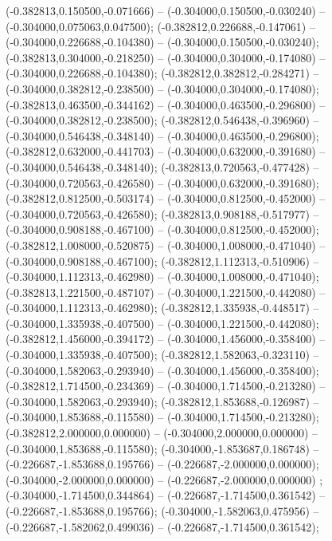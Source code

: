  (-0.382813,0.150500,-0.071666) -- (-0.304000,0.150500,-0.030240) -- (-0.304000,0.075063,0.047500);
 (-0.382812,0.226688,-0.147061) -- (-0.304000,0.226688,-0.104380) -- (-0.304000,0.150500,-0.030240);
 (-0.382813,0.304000,-0.218250) -- (-0.304000,0.304000,-0.174080) -- (-0.304000,0.226688,-0.104380);
 (-0.382812,0.382812,-0.284271) -- (-0.304000,0.382812,-0.238500) -- (-0.304000,0.304000,-0.174080);
 (-0.382813,0.463500,-0.344162) -- (-0.304000,0.463500,-0.296800) -- (-0.304000,0.382812,-0.238500);
 (-0.382812,0.546438,-0.396960) -- (-0.304000,0.546438,-0.348140) -- (-0.304000,0.463500,-0.296800);
 (-0.382812,0.632000,-0.441703) -- (-0.304000,0.632000,-0.391680) -- (-0.304000,0.546438,-0.348140);
 (-0.382813,0.720563,-0.477428) -- (-0.304000,0.720563,-0.426580) -- (-0.304000,0.632000,-0.391680);
 (-0.382812,0.812500,-0.503174) -- (-0.304000,0.812500,-0.452000) -- (-0.304000,0.720563,-0.426580);
 (-0.382813,0.908188,-0.517977) -- (-0.304000,0.908188,-0.467100) -- (-0.304000,0.812500,-0.452000);
 (-0.382812,1.008000,-0.520875) -- (-0.304000,1.008000,-0.471040) -- (-0.304000,0.908188,-0.467100);
 (-0.382812,1.112313,-0.510906) -- (-0.304000,1.112313,-0.462980) -- (-0.304000,1.008000,-0.471040);
 (-0.382813,1.221500,-0.487107) -- (-0.304000,1.221500,-0.442080) -- (-0.304000,1.112313,-0.462980);
 (-0.382812,1.335938,-0.448517) -- (-0.304000,1.335938,-0.407500) -- (-0.304000,1.221500,-0.442080);
 (-0.382812,1.456000,-0.394172) -- (-0.304000,1.456000,-0.358400) -- (-0.304000,1.335938,-0.407500);
 (-0.382812,1.582063,-0.323110) -- (-0.304000,1.582063,-0.293940) -- (-0.304000,1.456000,-0.358400);
 (-0.382812,1.714500,-0.234369) -- (-0.304000,1.714500,-0.213280) -- (-0.304000,1.582063,-0.293940);
 (-0.382812,1.853688,-0.126987) -- (-0.304000,1.853688,-0.115580) -- (-0.304000,1.714500,-0.213280);
 (-0.382812,2.000000,0.000000) -- (-0.304000,2.000000,0.000000) -- (-0.304000,1.853688,-0.115580);
 (-0.304000,-1.853687,0.186748) -- (-0.226687,-1.853688,0.195766) -- (-0.226687,-2.000000,0.000000);
 (-0.304000,-2.000000,0.000000) -- (-0.226687,-2.000000,0.000000) ;
 (-0.304000,-1.714500,0.344864) -- (-0.226687,-1.714500,0.361542) -- (-0.226687,-1.853688,0.195766);
 (-0.304000,-1.582063,0.475956) -- (-0.226687,-1.582062,0.499036) -- (-0.226687,-1.714500,0.361542);
